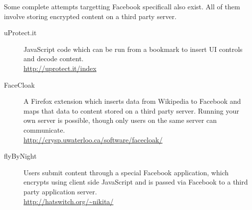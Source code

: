    Some complete attempts targetting Facebook specificall also exist. All of them involve storing encrypted content on a third party server.
    
    \begin{description}
        \item[uProtect.it] JavaScript code which can be run from a bookmark to insert UI controls and decode content. \hfill \\
        \url{http://uprotect.it/index}
        \item[FaceCloak] A Firefox extension which inserts data from Wikipedia to Facebook and maps that data to content stored on a third party server. Running your own server is possible, though only users on the same server can communicate. \hfill \\
        \url{http://crysp.uwaterloo.ca/software/facecloak/}
        \item[flyByNight] Users submit content through a special Facebook application, which encrypts using client side JavaScript and is passed via Facebook to a third party application server. \hfill \\
        \url{http://hatswitch.org/~nikita/}
    \end{description}
    
     







